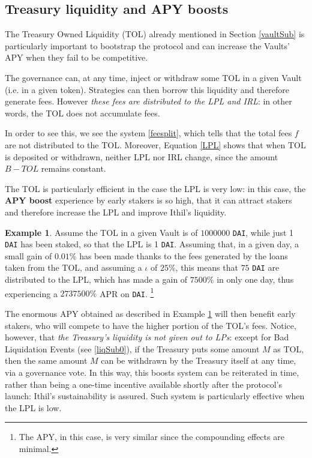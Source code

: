 \documentclass[a4paper,10 pt]{article}
\theoremstyle{definition}
\newtheorem{example}{Example}
\begin{document}
\subsection{Treasury liquidity and APY boosts}\label{glSub}

The Treasury Owned Liquidity (TOL) already mentioned in Section \ref{vaultSub} is particularly important to bootstrap the protocol and can increase the Vaults' APY when they fail to be competitive.

The governance can, at any time, inject or withdraw some TOL in a given Vault (i.e. in a given token). Strategies can then borrow this liquidity and therefore generate fees. However {\it these fees are distributed to the LPL and IRL}: in other words, the TOL does not accumulate fees.

In order to see this, we see the system \eqref{feesplit}, which tells that the total fees $f$ are not distributed to the TOL. Moreover, Equation \eqref{LPL} shows that when TOL is deposited or withdrawn, neither LPL nor IRL change, since the amount $B - TOL$ remains constant.

The TOL is particularly efficient in the case the LPL is very low: in this case, the {\bf APY boost} experience by early stakers is so high, that it can attract stakers and therefore increase the LPL and improve Ithil's liquidity.

\begin{example}\label{bigapy}
Assume the TOL in a given Vault is of $1000000$ \verb|DAI|, while just 1 \verb|DAI| has been staked, so that the LPL is 1 \verb|DAI|. Assuming that, in a given day, a small gain of $0.01\%$ has been made thanks to the fees generated by the loans taken from the TOL, and assuming a $\iota$ of $25\%$, this means that $75$ \verb|DAI| are distributed to the LPL, which has made a gain of $7500\%$ in only one day, thus experiencing a $2737500\%$ APR on \verb|DAI|. \footnote{The APY, in this case, is very similar since the compounding effects are minimal.}
\end{example}

The enormous APY obtained as described in Example \ref{bigapy} will then benefit early stakers, who will compete to have the higher portion of the TOL's fees. Notice, however, that {\it the Treasury's liquidity is not given out to LPs}: except for Bad Liquidation Events (see \ref{liqSub0}), if the Treasury puts some amount $M$ as TOL, then the same amount $M$ can be withdrawn by the Treasury itself at any time, via a governance vote. In this way, this boosts system can be reiterated in time, rather than being a one-time incentive available shortly after the protocol's launch: Ithil's sustainability is assured. Such system is particularly effective when the LPL is low.
\end{document}
